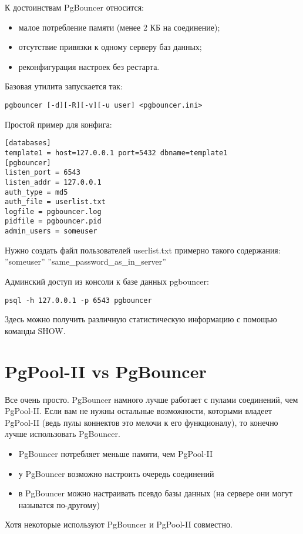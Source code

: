 К достоинствам PgBouncer относится:
\begin{itemize}
\item малое потребление памяти (менее 2 КБ на соединение);
\item отсутствие привязки к одному серверу баз данных;
\item реконфигурация настроек без рестарта.
\end{itemize}

Базовая утилита запускается так:
\begin{lstlisting}[label=lst:pgbouncer1,caption=PgBouncer]
pgbouncer [-d][-R][-v][-u user] <pgbouncer.ini>
\end{lstlisting}

Простой пример для конфига:
\begin{lstlisting}[label=lst:pgbouncer2,caption=PgBouncer]
[databases]
template1 = host=127.0.0.1 port=5432 dbname=template1
[pgbouncer]
listen_port = 6543
listen_addr = 127.0.0.1
auth_type = md5
auth_file = userlist.txt
logfile = pgbouncer.log
pidfile = pgbouncer.pid
admin_users = someuser
\end{lstlisting}

Нужно создать файл пользователей userlist.txt примерно такого содержания: ''someuser'' ''same\_password\_as\_in\_server''

Админский доступ из консоли к базе данных pgbouncer:
\begin{lstlisting}[label=lst:pgbouncer3,caption=PgBouncer]
psql -h 127.0.0.1 -p 6543 pgbouncer
\end{lstlisting}

Здесь можно получить различную статистическую информацию с помощью команды SHOW.

\section{PgPool-II vs PgBouncer}

Все очень просто. PgBouncer намного лучше работает с пулами соединений, чем PgPool-II. Если вам не 
нужны остальные возможности, которыми владеет PgPool-II (ведь пулы коннектов это мелочи к его функционалу), 
то конечно лучше использовать PgBouncer. 
\begin{itemize}
\item PgBouncer потребляет меньше памяти, чем PgPool-II
\item у PgBouncer возможно настроить очередь соединений
\item в PgBouncer можно настраивать псевдо базы данных (на сервере они могут называтся по-другому)
\end{itemize}

Хотя некоторые используют PgBouncer и PgPool-II совместно.